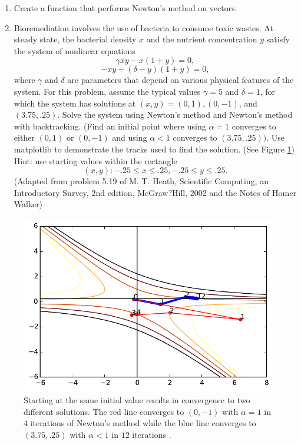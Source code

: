 \begin{problem}
\begin{enumerate}

\item Create a  function that performs Newton's method on vectors.
\item Bioremediation involves the use of bacteria to consume toxic wastes.
At steady state, the bacterial density $x$ and the nutrient concentration $y$ satisfy the system of nonlinear equations
\[
\gamma xy - x(1 + y) = 0,
\]
\[
 -xy + (\delta - y)(1 + y) = 0,
\]
where $\gamma$ and $\delta$ are parameters that depend on various physical features of the system. 
For this problem, assume the typical values $\gamma = 5$ and $\delta = 1$, for which the system has solutions at $(x, y) = (0, 1), (0, -1)$, and $(3.75, .25)$. 
Solve the system using Newton's method and Newton's method with backtracking. 
(Find an initial point where using $\alpha = 1$ converges to either $(0, 1)$ or $(0, -1)$ and using $\alpha < 1$ converges to $(3.75, .25)).$  
Use  matplotlib to demonstrate the tracks used to find the solution. (See Figure \ref{fig:contour_plot})
Hint: use starting values within the rectangle 
\[
{(x, y) : -.25 \leqslant x \leqslant .25, -.25 \leqslant y \leqslant .25}.
\]
(Adapted from problem 5.19 of M. T. Heath, Scientific Computing, an Introductory Survey, 2nd edition, McGraw?Hill, 2002 and the Notes of Homer Walker)
\end{enumerate}
\end{problem}

\begin{figure}[h]
\label{fig:contour_plot}
\centering
\includegraphics[width=\textwidth]{contour}
\caption{Starting at the same initial value results in convergence to two different solutions.  The red line converges to $(0,-1)$ with $\alpha = 1$ in $4$ iterations of Newton's method while the blue line converges to $(3.75,.25)$ with $\alpha < 1$ in $12$ iterations .}
\end{figure}

